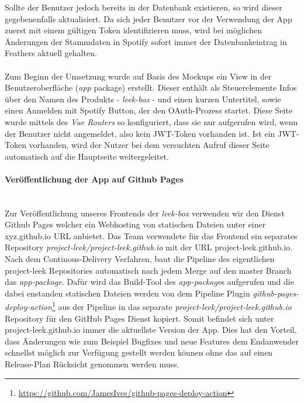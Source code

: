 \documentclass[10pt, a4paper]{article}
\begin{document}
Sollte der Benutzer jedoch bereits in der Datenbank existieren, so wird dieser gegebenenfalls aktualisiert. Da sich jeder Benutzer vor der Verwendung der App
zuerst  mit einem gültigen Token identifizieren muss, wird bei möglichen Änderungen der Stammdaten in Spotify sofort immer der Datenbankeintrag in Feathers
aktuell gehalten.
\\~\\
Zum Beginn der Umsetzung wurde auf Basis des Mockups ein View in der Benutzeroberfläche (\textit{app} package) erstellt. Dieser enthält als Steuerelemente Infos
über den Namen des Produkts - \textit{leek-box} - und einen kurzen Untertitel, sowie einen \glqq Anmelden mit Spotify\grqq{} Button, der den OAuth-Prozess startet.
Diese Seite wurde mittels des \textit{Vue Routers} so konfiguriert, dass sie nur aufgerufen wird, wenn der Benutzer nicht angemeldet, also kein JWT-Token
vorhanden ist. Ist ein JWT-Token vorhanden, wird der Nutzer bei dem versuchten Aufruf dieser Seite automatisch auf die Hauptseite weitergeleitet.

\paragraph*{Veröffentlichung der App auf Github Pages} $~$ \\
Zur Veröffentlichung unseres Frontends der \textit{leek-box} verwenden wir den Dienst Github Pages welcher ein Webhosting von statischen Dateien unter einer xyz.github.io URL anbietet.
Das Team verwendete für das Frontend ein separates Repository \textit{project-leek/project-leek.github.io} mit der URL project-leek.github.io.
Nach dem Continous-Delivery Verfahren, baut die Pipeline des eigentlichen project-leek Repositories automatisch nach jedem Merge auf den master Branch das \textit{app-package}.
Dafür wird das Build-Tool des \textit{app-package}s aufgerufen und die dabei enstanden statischen Dateien werden von dem Pipeline Plugin
\textit{github-pages-deploy-action}\footnote{\raggedright\url{https://github.com/JamesIves/github-pages-deploy-action}} aus der Pipeline in das separate
\textit{project-leek/project-leek.github.io} Repository für den GitHub Pages Dienst kopiert. Somit befindet sich unter project-leek.github.io immer die aktuellste Version der App.
Dies hat den Vorteil, dass Änderungen wie zum Beispiel Bugfixes und neue Features dem Endanwender schnellst möglich zur Verfügung gestellt werden können ohne das auf einen Release-Plan Rücksicht genommen werden muss.
\end{document}
